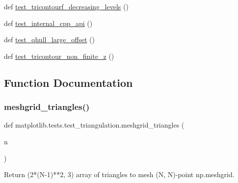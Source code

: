 \begin{DoxyCompactItemize}
\item 
def \hyperlink{namespacematplotlib_1_1tests_1_1test__triangulation_a6063e0f432f31f314b094e5ea600c540}{test\+\_\+tricontourf\+\_\+decreasing\+\_\+levels} ()
\item 
def \hyperlink{namespacematplotlib_1_1tests_1_1test__triangulation_abb1322c193dd2feef732bb7bbcfbe84a}{test\+\_\+internal\+\_\+cpp\+\_\+api} ()
\item 
def \hyperlink{namespacematplotlib_1_1tests_1_1test__triangulation_a79c01c0d00e810574733bfa98e0d1bc6}{test\+\_\+qhull\+\_\+large\+\_\+offset} ()
\item 
def \hyperlink{namespacematplotlib_1_1tests_1_1test__triangulation_ab65ff8023e846d861ea2a89a88823a7c}{test\+\_\+tricontour\+\_\+non\+\_\+finite\+\_\+z} ()
\end{DoxyCompactItemize}


\subsection{Function Documentation}
\mbox{\label{namespacematplotlib_1_1tests_1_1test__triangulation_aae8efee294742cb2eb4569443cb7243d}} 
\subsubsection{\texorpdfstring{meshgrid\+\_\+triangles()}{meshgrid\_triangles()}}
{\footnotesize\ttfamily def matplotlib.\+tests.\+test\+\_\+triangulation.\+meshgrid\+\_\+triangles (\begin{DoxyParamCaption}\item[{}]{n }\end{DoxyParamCaption})}

\begin{DoxyVerb}Return (2*(N-1)**2, 3) array of triangles to mesh (N, N)-point np.meshgrid.
\end{DoxyVerb}
 \mbox{\label{namespacematplotlib_1_1tests_1_1test__triangulation_a70efd6633395fc5cc677ff279c52ac9f}} 
